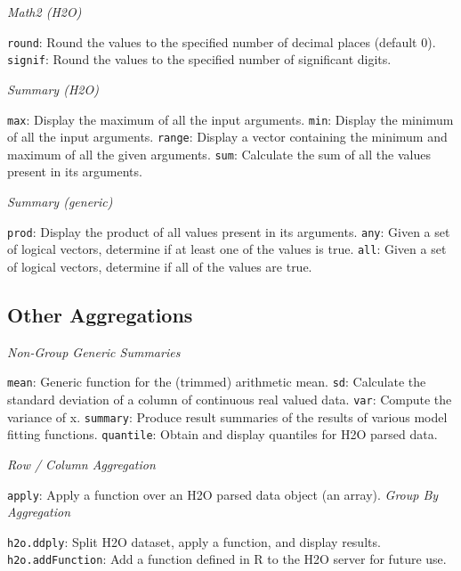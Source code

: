 {\emph{Math2 (H2O)}\par
{\texttt{round}}: Round the values to the specified number of decimal places (default 0). \newline
{\texttt{signif}}: Round the values to the specified number of significant digits.\newline

\emph{Summary (H2O)}\par
{\texttt{max}}: Display the maximum of all the input arguments. \newline
{\texttt{min}}: Display the minimum of all the input arguments. \newline
{\texttt{range}}: Display a vector containing the minimum and maximum of all the given arguments. \newline
{\texttt{sum}}: Calculate the sum of all the values present in its arguments.\newline

\emph{Summary (generic)}\par
{\texttt{prod}}: Display the product of all values present in its arguments. \newline
{\texttt{any}}: Given a set of logical vectors, determine if at least one of the values is true. \newline
{\texttt{all}}: Given a set of logical vectors, determine if all of the values are true.\newline

\subsection{Other Aggregations}

\emph{Non-Group Generic Summaries}\par
{\texttt{mean}}: Generic function for the (trimmed) arithmetic mean. \newline
{\texttt{sd}}: Calculate the standard deviation of a column of continuous real valued data. \newline
{\texttt{var}}: Compute the variance of x.\newline
{\texttt{summary}}: Produce result summaries of the results of various model fitting functions. \newline
{\texttt{quantile}}: Obtain and display quantiles for H2O parsed data.\newline

\emph{Row / Column Aggregation}\par
{\texttt{apply}: Apply a function over an H2O parsed data object (an array).\newline
\newpage
\emph{Group By Aggregation}\par
{\texttt{h2o.ddply}}: Split H2O dataset, apply a function, and display results.\newline
{\texttt{h2o.addFunction}}: Add a function defined in R to the H2O server for future use. \newline%

}}
